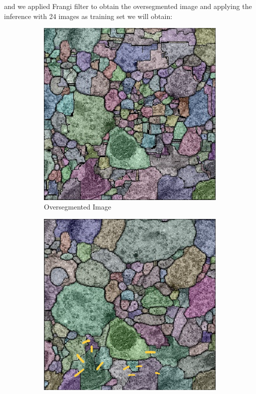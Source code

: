 \documentclass[12pt, a4paper]{scrartcl}
\begin{document}
and we applied Frangi filter to obtain the oversegmented image and applying the inference with 24 images as training set we will obtain:

\begin{figure}[H]
\centering
\begin{subfigure}{.3\textwidth}
  \centering
  \includegraphics[width=.9\linewidth]{oi1}
  \caption{Oversegmented Image}
  \label{fig:oi1}
\end{subfigure}%
\begin{subfigure}{.3\textwidth}
  \centering
  \includegraphics[width=.9\linewidth]{oi22}

\end{subfigure}
\end{figure}
\end{document}
